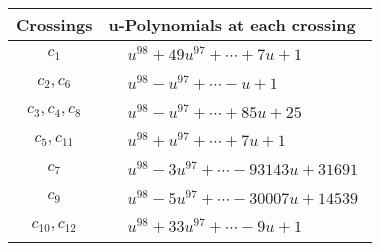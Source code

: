 \documentclass[1p]{elsarticle_modified}
\theoremstyle{definition}
\begin{document}
\begin{tabular}{m{50pt}|m{274pt}}
Crossings & \hspace{64pt}u-Polynomials at each crossing \\
\hline $$\begin{aligned}c_{1}\end{aligned}$$&$\begin{aligned}
&u^{98}+49 u^{97}+\cdots+7 u+1
\end{aligned}$\\
\hline $$\begin{aligned}c_{2},c_{6}\end{aligned}$$&$\begin{aligned}
&u^{98}- u^{97}+\cdots- u+1
\end{aligned}$\\
\hline $$\begin{aligned}c_{3},c_{4},c_{8}\end{aligned}$$&$\begin{aligned}
&u^{98}- u^{97}+\cdots+85 u+25
\end{aligned}$\\
\hline $$\begin{aligned}c_{5},c_{11}\end{aligned}$$&$\begin{aligned}
&u^{98}+u^{97}+\cdots+7 u+1
\end{aligned}$\\
\hline $$\begin{aligned}c_{7}\end{aligned}$$&$\begin{aligned}
&u^{98}-3 u^{97}+\cdots-93143 u+31691
\end{aligned}$\\
\hline $$\begin{aligned}c_{9}\end{aligned}$$&$\begin{aligned}
&u^{98}-5 u^{97}+\cdots-30007 u+14539
\end{aligned}$\\
\hline $$\begin{aligned}c_{10},c_{12}\end{aligned}$$&$\begin{aligned}
&u^{98}+33 u^{97}+\cdots-9 u+1
\end{aligned}$\\
\hline
\end{tabular}\\~\\
\newpage\renewcommand{\arraystretch}{1}
\end{document}
